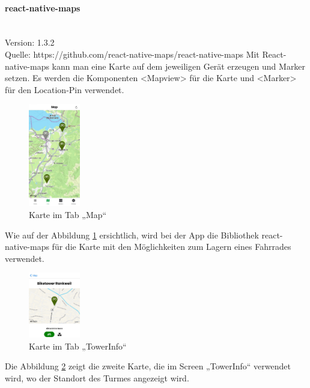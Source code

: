 \paragraph{react-native-maps}\mbox{}\\
Version: 1.3.2\\
Quelle: https://github.com/react-native-maps/react-native-maps
\bigskip
Mit React-native-maps kann man eine Karte auf dem jeweiligen Gerät erzeugen und Marker setzen. Es werden die Komponenten <Mapview> für die Karte und <Marker> für den \Gls{Location-Pin} verwendet.
\begin{figure}[H]
  \centering
  \includegraphics[width=0.2\textwidth]{images/app-screenshots/tabmap.jpg}
  \caption{Karte im Tab „Map“}
  \label{fig:tabmap}
\end{figure}
Wie auf der Abbildung \ref{fig:tabmap} ersichtlich, wird bei der App die Bibliothek react-native-maps für die Karte mit den Möglichkeiten zum Lagern eines Fahrrades verwendet.
\begin{figure}[H]
  \centering
  \includegraphics[width=0.2\textwidth]{images/app-screenshots/smallmap.png}
  \caption{Karte im Tab „TowerInfo“}
  \label{fig:smallmap}
\end{figure}
Die Abbildung \ref{fig:smallmap} zeigt die zweite Karte, die im Screen „TowerInfo“ verwendet wird, wo der Standort des Turmes angezeigt wird.


